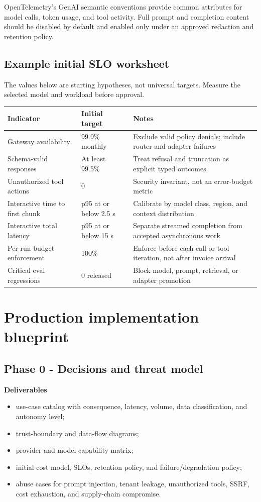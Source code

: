 \documentclass[10pt]{article}
\begin{document}
OpenTelemetry's GenAI semantic conventions provide common attributes for model calls, token usage, and tool activity. Full prompt and completion content should be disabled by default and enabled only under an approved redaction and retention policy.\cite{otel-genai}

\subsection{Example initial SLO worksheet}

The values below are starting hypotheses, not universal targets. Measure the selected model and workload before approval.

\noindent\begin{tabularx}{\textwidth}{P{0.29\textwidth} P{0.22\textwidth} Y}
\toprule
\textbf{Indicator} & \textbf{Initial target} & \textbf{Notes} \\
\midrule
Gateway availability & 99.9\% monthly & Exclude valid policy denials; include router and adapter failures \\
Schema-valid responses & At least 99.5\% & Treat refusal and truncation as explicit typed outcomes \\
Unauthorized tool actions & 0 & Security invariant, not an error-budget metric \\
Interactive time to first chunk & p95 at or below 2.5 s & Calibrate by model class, region, and context distribution \\
Interactive total latency & p95 at or below 15 s & Separate streamed completion from accepted asynchronous work \\
Per-run budget enforcement & 100\% & Enforce before each call or tool iteration, not after invoice arrival \\
Critical eval regressions & 0 released & Block model, prompt, retrieval, or adapter promotion \\
\bottomrule
\end{tabularx}

\section{Production implementation blueprint}

\subsection{Phase 0 - Decisions and threat model}

\textbf{Deliverables}
\begin{itemize}
  \item use-case catalog with consequence, latency, volume, data classification, and autonomy level;
  \item trust-boundary and data-flow diagrams;
  \item provider and model capability matrix;
  \item initial cost model, SLOs, retention policy, and failure/degradation policy;
  \item abuse cases for prompt injection, tenant leakage, unauthorized tools, SSRF, cost exhaustion, and supply-chain compromise.
\end{itemize}
\end{document}

